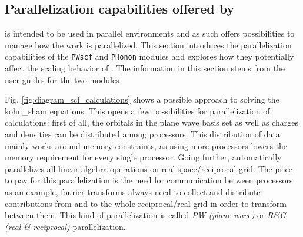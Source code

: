 \documentclass[main.tex]{subfiles}
\begin{document}
\subsection{Parallelization capabilities offered by \QE}\label{sub:qe_parallelization}

\QE is intended to be used in parallel environments and as such offers possibilities to manage how the work is parallelized.
This section introduces the parallelization capabilities of the \texttt{PWscf} and \texttt{PHonon} modules and explores how they potentially affect the scaling behavior of \QE. The information in this section stems from the user guides for the two modules \cite{noauthor_pwscf_nodate, noauthor_phonon_nodate}


Fig. \ref{fig:diagram_scf_calculations} shows a possible approach to solving the \acrshort{kohn_sham} equations.
This opens a few possibilities for parallelization of calculations: first of all, the orbitals in the plane wave basis set as well as charges and densities can be distributed among processors.
This distribution of data mainly works around memory constraints, as using more processors lowers the memory requirement for every single processor.
Going further, \QE automatically parallelizes all linear algebra operations on real space/reciprocal grid.
The price to pay for this parallelization is the need for communication between processors: as an example, fourier transforms always need to collect and distribute contributions from and to the whole reciprocal/real grid in order to transform between them.
This kind of parallelization is called \emph{PW (plane wave)} or \emph{R\&G (real \& reciprocal)} parallelization. 
\end{document}
